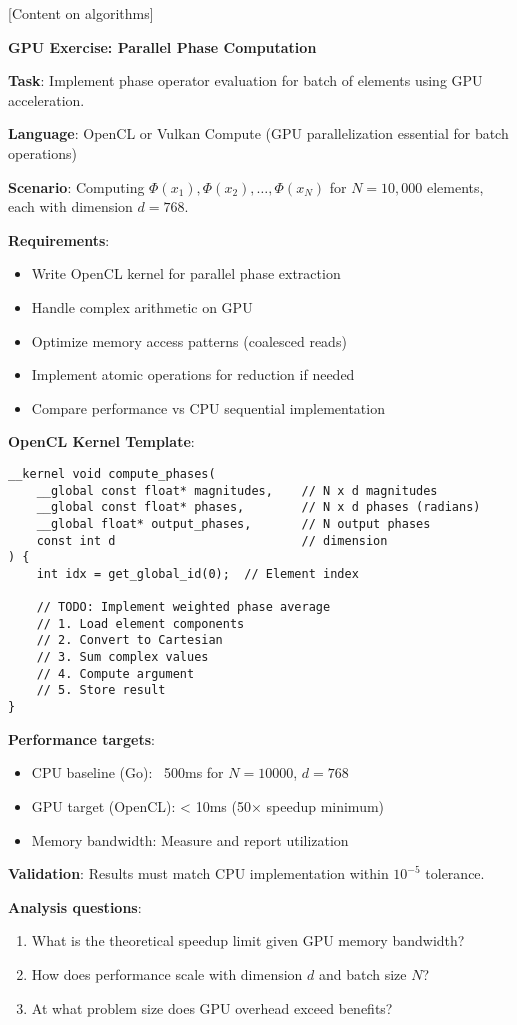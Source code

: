 [Content on algorithms]

\begin{coding}
\textbf{GPU Exercise: Parallel Phase Computation}

\textbf{Task}: Implement phase operator evaluation for batch of elements using GPU acceleration.

\textbf{Language}: OpenCL or Vulkan Compute (GPU parallelization essential for batch operations)

\textbf{Scenario}: Computing $\Phi(x_1), \Phi(x_2), \ldots, \Phi(x_N)$ for $N=10,000$ elements, each with dimension $d=768$.

\textbf{Requirements}:
\begin{itemize}
\item Write OpenCL kernel for parallel phase extraction
\item Handle complex arithmetic on GPU
\item Optimize memory access patterns (coalesced reads)
\item Implement atomic operations for reduction if needed
\item Compare performance vs CPU sequential implementation
\end{itemize}

\textbf{OpenCL Kernel Template}:
\begin{lstlisting}[style=opencl]
__kernel void compute_phases(
    __global const float* magnitudes,    // N x d magnitudes
    __global const float* phases,        // N x d phases (radians)
    __global float* output_phases,       // N output phases
    const int d                          // dimension
) {
    int idx = get_global_id(0);  // Element index
    
    // TODO: Implement weighted phase average
    // 1. Load element components
    // 2. Convert to Cartesian
    // 3. Sum complex values
    // 4. Compute argument
    // 5. Store result
}
\end{lstlisting}

\textbf{Performance targets}:
\begin{itemize}
\item CPU baseline (Go): ~500ms for $N=10000$, $d=768$
\item GPU target (OpenCL): < 10ms (50× speedup minimum)
\item Memory bandwidth: Measure and report utilization
\end{itemize}

\textbf{Validation}: Results must match CPU implementation within $10^{-5}$ tolerance.

\textbf{Analysis questions}:
\begin{enumerate}
\item What is the theoretical speedup limit given GPU memory bandwidth?
\item How does performance scale with dimension $d$ and batch size $N$?
\item At what problem size does GPU overhead exceed benefits?
\end{enumerate}
\end{coding}


